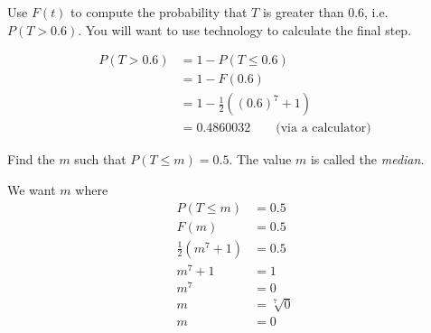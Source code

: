 \documentclass[10pt]{article}
\begin{document}
{\begin{solution}
\end{solution}
        

        \item Use $F(t)$ to compute the probability that \( T \) is greater than 0.6, i.e. $P(T>0.6)$. You will want to use technology to calculate the final step.
\begin{solution}
\begin{align*}
        P(T> 0.6)&=1-P(T\leq0.6)\\
        &=1-F(0.6)\\
        &=1-\frac{1}{2}\left((0.6)^7+1\right)\\
        &=0.4860032 \qquad\text{(via a calculator)}
\end{align*}
\end{solution}
        
        
        \item Find the  \( m \) such that \( P(T \leq m) = 0.5 \). The value  $m$ is called the {\em median}.
\begin{solution}
We want $m$ where
\begin{align*}
P(T \leq m) &= 0.5\\
F(m)&=0.5\\
\frac{1}{2}(m^7+1)&=0.5\\
m^7+1&=1\\
m^7&=0\\
m&=\sqrt[7]{0}\\
m&=0
\end{align*}
\end{solution}
}
\newpage
\end{document}
